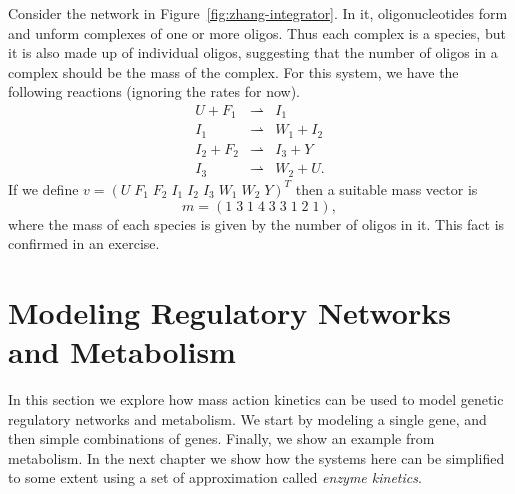 \begin{example}\label{ex:zhang-integrator}
  Consider the network in Figure~\ref{fig:zhang-integrator}. In it,
  oligonucleotides form and unform complexes of one or more
  oligos. Thus each complex is a species, but it is also made up of
  individual oligos, suggesting that the number of oligos in a complex
  should be the mass of the complex. For this system, we have the
  following reactions (ignoring the rates for now).
%
\begin{eqnarray*}
U + F_1 & \rightharpoonup & I_1 \\
I_1 & \rightharpoonup & W_1 + I_2 \\
I_2 + F_2 & \rightharpoonup & I_3 + Y \\
I_3 & \rightharpoonup & W_2 + U .
\end{eqnarray*}
%
If we define $v = ( U \; F_1 \; F_2 \; I_1 \; I_2 \; I_3 \; W_1 \; W_2 \; Y )^T$
then a suitable mass vector is
%
$$
m = ( 1 \; 3 \; 1 \; 4 \; 3 \; 3 \; 1 \; 2 \; 1 ) ,
$$
%
where the mass of each species is given by the number of oligos in
it. This fact is confirmed in an exercise.  \enx
\end{example}

\section{Modeling Regulatory Networks and Metabolism}

%
%


In this section we explore how mass action kinetics can be used to
model genetic regulatory networks and metabolism. We start by modeling
a single gene, and then simple combinations of genes. Finally, we show
an example from metabolism. In the next chapter we show how the
systems here can be simplified to some extent using a set of
approximation called {\em enzyme kinetics}. 

